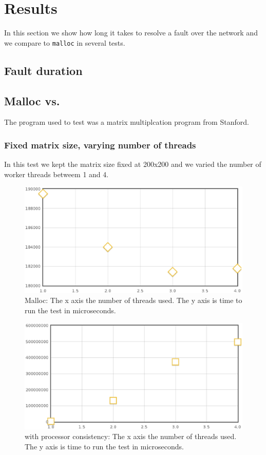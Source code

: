 \section{Results}

In this section we show how long it takes to resolve a fault over the network and we compare \projname{} to \verb,malloc, in several tests.

\subsection{Fault duration}


\subsection{Malloc vs. \projname{}}

The program used to test was a matrix multiplcation program from Stanford.

\subsubsection{Fixed matrix size, varying number of threads}

In this test we kept the matrix size fixed at 200x200 and we varied the number of worker threads betweem 1 and 4.

\begin{figure}[!h]
\centering
\includegraphics[scale=0.40]{images/malloc-fixed-matrix.eps}
\caption{Malloc: The x axis the number of threads used. The y axis is time to run the test in microseconds.}
\end{figure}

\begin{figure}[!h]
\centering
\includegraphics[scale=0.40]{images/mmult-lh-fixed-size.eps}
\caption{\projname{} with processor consistency: The x axis the number of threads used. The y axis is time to run the test in microseconds.}
\end{figure}

